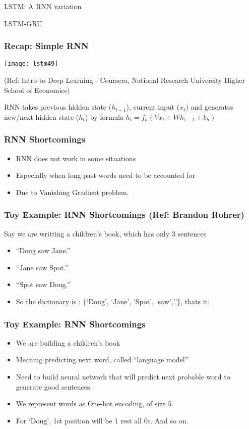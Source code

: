 
\begin{frame}
  \begin{center}
    {\Large LSTM: A RNN variation}
    
    LSTM-GRU
  \end{center}
\end{frame}

\begin{frame}[fragile] \frametitle{Recap: Simple RNN}
\begin{center}
\texttt{[image: lstm49]}

\tiny{(Ref: Intro to Deep Learning - Coursera, National Research University Higher School of Economics)}
\end{center}
RNN takes previous hidden state ($h_{t-1}$), current input ($x_t$) and generates new/next hidden state ($h_t$) by formula $h_t = f_h ( Vx_t + Wh_{t-1} + b_h)$
\end{frame}

\begin{frame}[fragile] \frametitle{RNN Shortcomings}
\begin{itemize}
\item RNN does not work in some situations
\item Especially when long past words need to be accounted for
\item Due to Vanishing Gradient problem.
\end{itemize}
\end{frame}

\begin{frame}[fragile] \frametitle{Toy Example: RNN Shortcomings (Ref: Brandon Rohrer)}
Say we are writting a children's book, which has only 3 sentences
\begin{itemize}
\item ``Doug saw Jane.''
\item ``Jane saw Spot.''
\item ``Spot saw Doug.''
\item So the dictionary is : \{`Doug', `Jane', `Spot', `saw','.'\}, thats it.
\end{itemize}
\end{frame}

\begin{frame}[fragile] \frametitle{Toy Example: RNN Shortcomings}
\begin{itemize}
\item We are building a children's book
\item Meaning predicting next word, called ``language model''
\item Need to build neural network that will predict next probable word to generate good sentences.
\item We represent words as One-hot encoding, of size 5.
\item For `Doug', 1st position will be 1 rest all 0s. And so on.
\end{itemize}
\end{frame}

